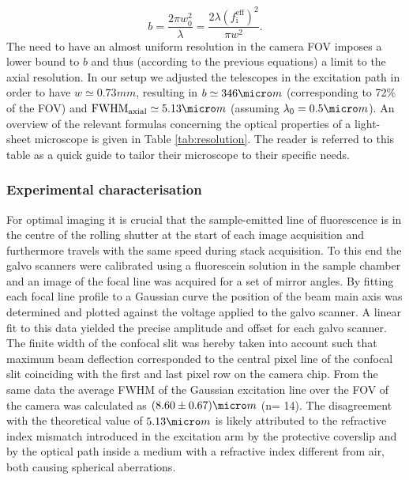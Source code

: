 \documentclass[12pt]{spieman}  %
\begin{document}
\begin{spacing}{2}
\begin{equation}
b = \frac{2\pi w_0^2}{\lambda} = \frac{2 \lambda  {(f_{\text{i}}^{\text{eff}})}^2}{\pi w^2}.
\end{equation}
The need to have an almost uniform resolution in the camera FOV imposes a lower bound to $b$ and thus (according to the previous equations) a limit to the axial resolution. In our setup we adjusted the telescopes in the excitation path in order to have $w \simeq 0.73 mm$, resulting in $b \simeq 346 \micro m$ (corresponding to 72\% of the FOV) and $\text{FWHM}_{\text{axial}} \simeq 5.13 \micro m$ (assuming $\lambda_0 = 0.5 \micro m$). An overview of the relevant formulas concerning the optical properties of a light-sheet microscope is given in Table \ref{tab:resolution}. The reader is referred to this table as a quick guide to tailor their microscope to their specific needs.

\subsubsection{Experimental characterisation}

For optimal imaging it is crucial that the sample-emitted line of fluorescence is in the centre of the rolling shutter at the start of each image acquisition and furthermore travels with the same speed during stack acquisition. To this end the galvo scanners were calibrated using a fluorescein solution in the sample chamber and an image of the focal line was acquired for a set of mirror angles. By fitting each focal line profile to a Gaussian curve the position of the beam main axis was determined and plotted against the voltage applied to the galvo scanner. A linear fit to this data yielded the precise amplitude and offset for each galvo scanner. The finite width of the confocal slit was hereby taken into account such that maximum beam deflection corresponded to the central pixel line of the confocal slit coinciding with the first and last pixel row on the camera chip. From the same data the average FWHM of the Gaussian excitation line over the FOV of the camera was calculated as $(8.60\pm0.67)\micro m$ (n= 14). The disagreement with the theoretical value of $5.13 \micro m$ is likely attributed to the refractive index mismatch introduced in the excitation arm by the protective coverslip and by the optical path inside a medium with a refractive index different from air, both causing spherical aberrations\cite{Booth2001}.


\end{spacing}
\end{document}
